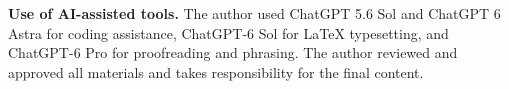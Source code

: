\documentclass[12pt]{article}
\begin{document}
\noindent\textbf{Use of AI-assisted tools.} The author used ChatGPT 5.6 Sol and ChatGPT 6 Astra for coding assistance, ChatGPT-6 Sol for \LaTeX{} typesetting, and ChatGPT-6 Pro for proofreading and phrasing. The author reviewed and approved all materials and takes responsibility for the final content.

\FloatBarrier


\end{document}
